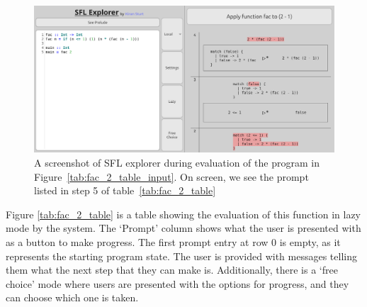 \begin{figure}[t]
  \centering
  \includegraphics[width=0.95\linewidth]{images/intro_fac_2.png}
  \caption{A screenshot of SFL explorer during evaluation of the program in Figure~\ref{tab:fac_2_table_input}. On screen, we see the prompt listed in step 5 of table~\ref{tab:fac_2_table}}
  \label{intro_fac_2_screenshot}
\end{figure}

\noindent Figure \ref{tab:fac_2_table} is a table showing the evaluation of this function in lazy mode by the system. The `Prompt' column shows what the user is presented with as a button to make progress. The first prompt entry at row $0$ is empty, as it represents the starting program state. The user is provided with messages telling them what the next step that they can make is. Additionally, there is a `free choice' mode where users are presented with the options for progress, and they can choose which one is taken. 





